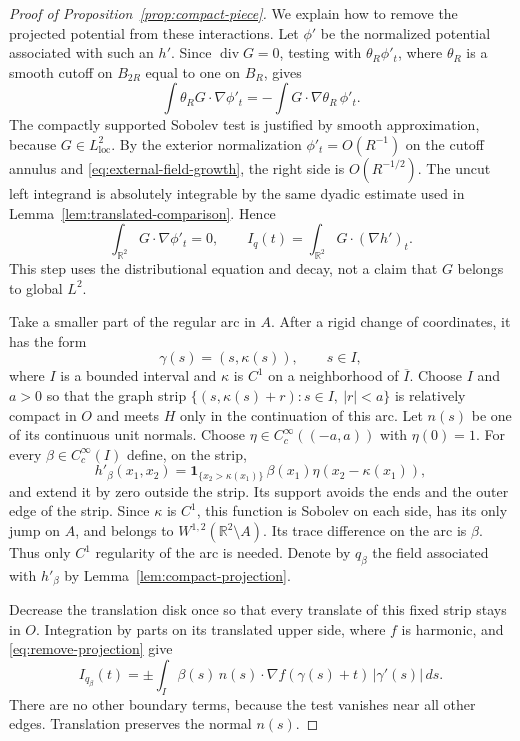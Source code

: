 \begin{proof}[Proof of Proposition~\ref{prop:compact-piece}]
We explain how to remove the projected potential from these interactions.
Let $\phi'$ be the normalized potential associated with such an $h'$.
Since $\operatorname{div}G=0$, testing with $\theta_R\phi'_t$, where
$\theta_R$ is a smooth cutoff on $B_{2R}$ equal to one on $B_R$, gives
\[
 \int\theta_R G\cdot\nabla\phi'_t
       =-\int G\cdot\nabla\theta_R\,\phi'_t.
\]
The compactly supported Sobolev test is justified by smooth approximation,
because $G\in L^2_{\mathrm{loc}}$. By the exterior normalization
$\phi'_t=O(R^{-1})$ on the cutoff annulus and
\eqref{eq:external-field-growth}, the right side is $O(R^{-1/2})$.
The uncut left integrand is absolutely integrable by the same dyadic
estimate used in Lemma~\ref{lem:translated-comparison}. Hence
\begin{equation}
 \int_{\mathbb R^2}G\cdot\nabla\phi'_t=0,
 \qquad
 I_q(t)=\int_{\mathbb R^2}G\cdot(\nabla h')_t.
 \label{eq:remove-projection}
\end{equation}
This step uses the distributional equation and decay, not a claim that
$G$ belongs to global $L^2$.

Take a smaller part of the regular arc in $A$. After a rigid change of
coordinates, it has the form
\[
 \gamma(s)=(s,\kappa(s)),\qquad s\in I,
\]
where $I$ is a bounded interval and $\kappa$ is $C^1$ on a neighborhood of
$\overline I$. Choose $I$ and $a>0$ so that the graph strip
$\{(s,\kappa(s)+r):s\in I,\ |r|<a\}$ is relatively compact in $O$
and meets $H$ only in the continuation of this arc. Let $n(s)$ be one
of its continuous unit normals. Choose
$\eta\in C_c^\infty((-a,a))$ with $\eta(0)=1$.
For every $\beta\in C_c^\infty(I)$ define, on the strip,
\[
 h'_\beta(x_1,x_2)
   =\mathbf 1_{\{x_2>\kappa(x_1)\}}\,
        \beta(x_1)\eta(x_2-\kappa(x_1)),
\]
and extend it by zero outside the strip. Its support avoids the ends
and the outer edge of the strip. Since $\kappa$ is $C^1$, this function is
Sobolev on each side, has its only jump on $A$, and belongs to
$W^{1,2}(\mathbb R^2\setminus A)$. Its trace difference on the arc
is $\beta$. Thus only $C^1$ regularity of the arc is needed. Denote by
$q_\beta$ the field associated with $h'_\beta$ by
Lemma~\ref{lem:compact-projection}.

Decrease the translation disk once so that every translate of this
fixed strip stays in $O$. Integration by parts on its translated upper
side, where $f$ is harmonic, and \eqref{eq:remove-projection} give
\begin{equation}
 I_{q_\beta}(t)
   =\pm\int_I\beta(s)\,
       n(s)\cdot\nabla f(\gamma(s)+t)\,|\gamma'(s)|\,ds.
 \label{eq:jump-flux}
\end{equation}
There are no other boundary terms, because the test vanishes near all
other edges. Translation preserves the normal $n(s)$.


\end{proof}
